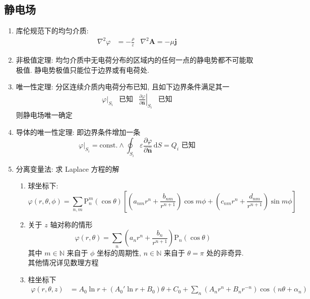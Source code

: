 \documentclass[12pt,a4paper]{article}%
\numberwithin{equation}{section}%
\renewcommand*{\vec}[1]{\bm{#1}}%
\newcommand{\dif}{\,\mathrm d}
\newcommand*{\uvec}[1]{\hat{\vec{#1}}}
\begin{document}
\subsection{静电场} %
\label{sub:static_elctro}
\begin{enumerate}
    \item 库伦规范下的均匀介质:
    \begin{align}
        \nabla^2\varphi &= -\frac{\rho}{\varepsilon} &\nabla^2\vec A = -\mu\vec j
    \end{align}
    \item 非极值定理: 均匀介质中无电荷分布的区域内的任何一点的静电势都不可能取极值. 静电势极值只能位于边界或有电荷处.
    \item 唯一性定理: 分区连续介质内电荷分布已知, 且如下边界条件满足其一
    \begin{align}
        \varphi|_{S_i} &\mbox{已知} &\left.\frac{\partial\varphi}{\partial\uvec n}\right|_{S_i} &\mbox{已知}
    \end{align}
    则静电场唯一确定
    \item 导体的唯一性定理: 即边界条件增加一条
    \begin{equation}
        \varphi|_{S_i} = \mbox{const.} \land \oint_{S_i}\varepsilon\frac{\partial\varphi}{\partial\uvec n}\dif S = Q_i\mbox{ 已知}
    \end{equation}
    \item 分离变量法: 求 Laplace 方程的解
    \begin{enumerate}
        \item 球坐标下: 
        \begin{equation}
            \varphi(r,\theta,\phi) = \sum_{n,m}\mathrm P_n^m(\cos\theta)\left[\left(a_{nm}r^n + \frac{b_{nm}}{r^{n+1}}\right)\cos m\phi + \left(c_{nm}r^n + \frac{d_{nm}}{r^{n+1}}\right)\sin m\phi\right]
        \end{equation}
        \item 关于 $z$ 轴对称的情形
        \begin{equation}
            \varphi(r,\theta) = \sum_n\left(a_n r^n + \frac{b_n}{r^{n+1}}\right)\mathrm P_n(\cos\theta)
        \end{equation}
        其中 $m\in\mathbb N$ 来自于 $\phi$ 坐标的周期性, $n\in\mathbb N$ 来自于 $\theta = \pi$ 处的非奇异. \\
        其他情况详见数理方程
        \item 柱坐标下
        \begin{align}
            \varphi(r,\theta,z) &= A_0\ln r + (A_0'\ln r + B_0)\theta + C_0 + \sum_n(A_n r^n + B_n r^{-n})\cos(n\theta + \alpha_n) \\

\end{align}
\end{enumerate}
\end{enumerate}
\end{document}
